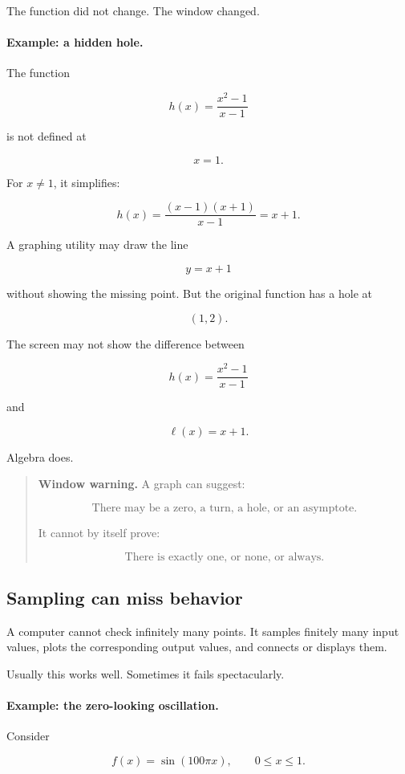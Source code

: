 The function did not change. The window changed.

\paragraph{Example: a hidden hole.}
The function

\[
h(x)=\frac{x^2-1}{x-1}
\]

is not defined at

\[
x=1.
\]

For \(x\neq1\), it simplifies:

\[
h(x)=\frac{(x-1)(x+1)}{x-1}=x+1.
\]

A graphing utility may draw the line

\[
y=x+1
\]

without showing the missing point. But the original function has a hole at

\[
(1,2).
\]

The screen may not show the difference between

\[
h(x)=\frac{x^2-1}{x-1}
\]

and

\[
\ell(x)=x+1.
\]

Algebra does.

\begin{quote}
\textbf{Window warning.}
A graph can suggest:

\[
\text{There may be a zero, a turn, a hole, or an asymptote.}
\]

It cannot by itself prove:

\[
\text{There is exactly one, or none, or always.}
\]
\end{quote}

\subsection{Sampling can miss behavior}
\label{subsec:sampling-can-miss-behavior}

A computer cannot check infinitely many points. It samples finitely many input values, plots the corresponding output values, and connects or displays them.

Usually this works well. Sometimes it fails spectacularly.

\paragraph{Example: the zero-looking oscillation.}
Consider

\[
f(x)=\sin(100\pi x),
\qquad 0\le x\le 1.
\]

